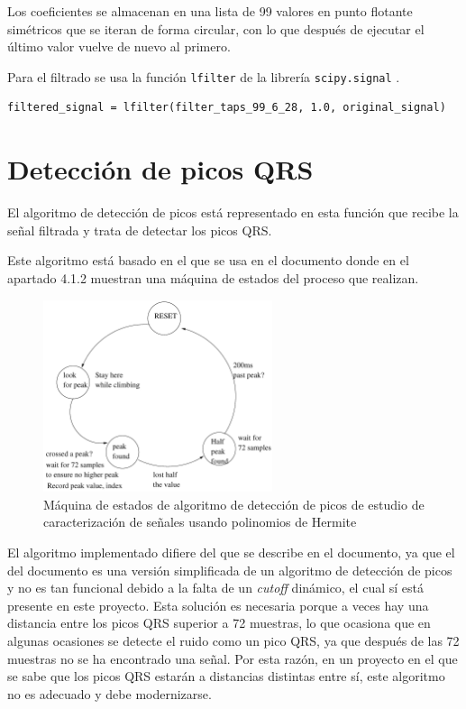 Los coeficientes se almacenan en una lista de 99 valores en punto flotante simétricos que se iteran de forma circular, con lo que después de ejecutar el último valor vuelve de nuevo al primero.  

Para el filtrado se usa la función \texttt{lfilter} de la librería \texttt{scipy.signal} \cite{SciPy}.

\lstset{language=python, breaklines=true, basicstyle=\footnotesize}
\begin{lstlisting}[frame=single]
    filtered_signal = lfilter(filter_taps_99_6_28, 1.0, original_signal)
\end{lstlisting}

\section{Detección de picos QRS}

El algoritmo de detección de picos está representado en esta función que recibe la señal filtrada y trata de detectar los picos QRS.

Este algoritmo está basado en el que se usa en el documento \cite{desai2021low} donde en el apartado 4.1.2 muestran una máquina de estados del proceso que realizan.

\begin{figure}[h!]
    \centering
    \includegraphics[width=0.6\textwidth]{./Images/img_algoritmo/fsm_mdpi.png}
    \caption{Máquina de estados de algoritmo de detección de picos de estudio de caracterización de señales usando polinomios de Hermite \cite{desai2021low}}
    \label{fig:fsm_mpdi}
\end{figure}

El algoritmo implementado difiere del que se describe en el documento, ya que el del documento es una versión simplificada de un algoritmo de detección de picos y no es tan funcional debido a la falta de un \textit{cutoff} dinámico, el cual sí está presente en este proyecto. Esta solución es necesaria porque a veces hay una distancia entre los picos QRS superior a 72 muestras, lo que ocasiona que en algunas ocasiones se detecte el ruido como un pico QRS, ya que después de las 72 muestras no se ha encontrado una señal. Por esta razón, en un proyecto en el que se sabe que los picos QRS estarán a distancias distintas entre sí, este algoritmo no es adecuado y debe modernizarse.

